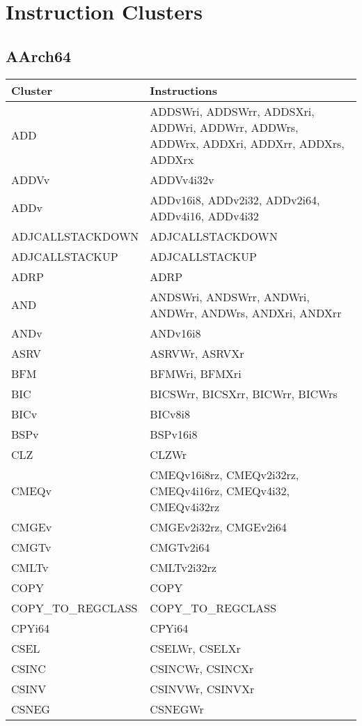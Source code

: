 \chapter{Instruction Clusters}
\label{app:instr-clusters}
\section{AArch64}
\begin{xltabular}{\textwidth}{lX}
    \toprule
    Cluster & Instructions \\
    \midrule
    \endhead

    \bottomrule
    \endfoot

    ADD & ADDSWri, ADDSWrr, ADDSXri, ADDWri, ADDWrr, ADDWrs, ADDWrx, ADDXri, ADDXrr, ADDXrs, ADDXrx \\
    ADDVv & ADDVv4i32v \\
    ADDv & ADDv16i8, ADDv2i32, ADDv2i64, ADDv4i16, ADDv4i32 \\
    ADJCALLSTACKDOWN & ADJCALLSTACKDOWN \\
    ADJCALLSTACKUP & ADJCALLSTACKUP \\
    ADRP & ADRP \\
    AND & ANDSWri, ANDSWrr, ANDWri, ANDWrr, ANDWrs, ANDXri, ANDXrr \\
    ANDv & ANDv16i8 \\
    ASRV & ASRVWr, ASRVXr \\
    BFM & BFMWri, BFMXri \\
    BIC & BICSWrr, BICSXrr, BICWrr, BICWrs \\
    BICv & BICv8i8 \\
    BSPv & BSPv16i8 \\
    CLZ & CLZWr \\
    CMEQv & CMEQv16i8rz, CMEQv2i32rz, CMEQv4i16rz, CMEQv4i32, CMEQv4i32rz \\
    CMGEv & CMGEv2i32rz, CMGEv2i64 \\
    CMGTv & CMGTv2i64 \\
    CMLTv & CMLTv2i32rz \\
    COPY & COPY \\
    COPY\_TO\_REGCLASS & COPY\_TO\_REGCLASS \\
    CPYi64 & CPYi64 \\
    CSEL & CSELWr, CSELXr \\
    CSINC & CSINCWr, CSINCXr \\
    CSINV & CSINVWr, CSINVXr \\
    CSNEG & CSNEGWr \\

\end{xltabular}
